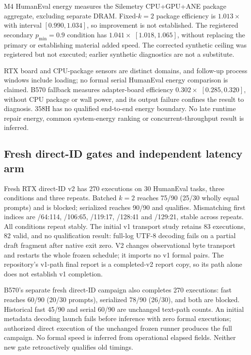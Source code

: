 M4 HumanEval energy measures the Silemetry CPU+GPU+ANE package aggregate, excluding separate DRAM. Fixed-$k=2$ package efficiency is $1.013\times$ with interval $[0.990,1.034]$, so improvement is not established. The registered secondary $p_{\min}=0.9$ condition has $1.041\times$ $[1.018,1.065]$, without replacing the primary or establishing material added speed. The corrected synthetic ceiling was registered but not executed; earlier synthetic diagnostics are not a substitute.

RTX board and CPU-package sensors are distinct domains, and follow-up process windows include loading; no formal serial HumanEval energy comparison is claimed. B570 fallback measures adapter-board efficiency $0.302\times$ $[0.285,0.320]$, without CPU package or wall power, and its output failure confines the result to diagnosis. 358H has no qualified end-to-end energy boundary. No late runtime repair energy, common system-energy ranking or concurrent-throughput result is inferred.

\subsection{Fresh direct-ID gates and independent latency arm}
Fresh RTX direct-ID v2 has 270 executions on 30 HumanEval tasks, three conditions and three repeats. Batched $k=2$ reaches 75/90 (25/30 wholly equal prompts) and is blocked; serialized reaches 90/90 and qualifies. Mismatching first indices are /64:114, /106:65, /119:17, /128:41 and /129:21, stable across repeats. All conditions repeat stably. The initial v1 transport study retains 83 executions, 82 valid, and no qualification result: full-log UTF-8 decoding fails on a partial draft fragment after native exit zero. V2 changes observational byte transport and restarts the whole frozen schedule; it imports no v1 formal pairs. The repository's v1-path final report is a completed-v2 report copy, so its path alone does not establish v1 completion.

B570's separate fresh direct-ID campaign also completes 270 executions: fast reaches 60/90 (20/30 prompts), serialized 78/90 (26/30), and both are blocked. Historical fast 45/90 and serial 60/90 are unchanged text-path counts. An initial metadata decoding launch fails before inference with zero formal executions; authorized direct execution of the unchanged frozen runner produces the full campaign. No formal speed is inferred from operational elapsed fields. Neither new gate retroactively qualifies old timings.

